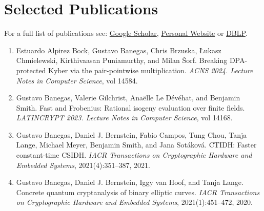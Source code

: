 \section*{Selected Publications}

For a full list of publications see: \href{https://scholar.google.com/citations?user=0AIDhMwAAAAJ&hl=fr}{Google Scholar}, 
\href{https://cryptme.in/#publications}{Personal Website} or \href{https://dblp.org/pid/150/9441.html}{DBLP}.

\begin{enumerate}\small
\item Estuardo Alpirez Bock, Gustavo Banegas, Chris Brzuska, Łukasz Chmielewski, Kirthivaasan Puniamurthy, and Milan Šorf. Breaking DPA-protected Kyber via the pair-pointwise multiplication. \textit{ACNS 2024. Lecture Notes in Computer Science}, vol 14584.
\item Gustavo Banegas, Valerie Gilchrist, Anaëlle Le Dévéhat, and Benjamin Smith. Fast and Frobenius: Rational isogeny evaluation over finite fields. \textit{LATINCRYPT 2023. Lecture Notes in Computer Science}, vol 14168.
\item Gustavo Banegas, Daniel J. Bernstein, Fabio Campos, Tung Chou, Tanja Lange, Michael Meyer, Benjamin Smith, and Jana Sotáková. CTIDH: Faster constant-time CSIDH. \textit{IACR Transactions on Cryptographic Hardware and Embedded Systems}, 2021(4):351–387, 2021.
\item Gustavo Banegas, Daniel J. Bernstein, Iggy van Hoof, and Tanja Lange. Concrete quantum cryptanalysis of binary elliptic curves. \textit{IACR Transactions on Cryptographic Hardware and Embedded Systems}, 2021(1):451–472, 2020.

\end{enumerate}
